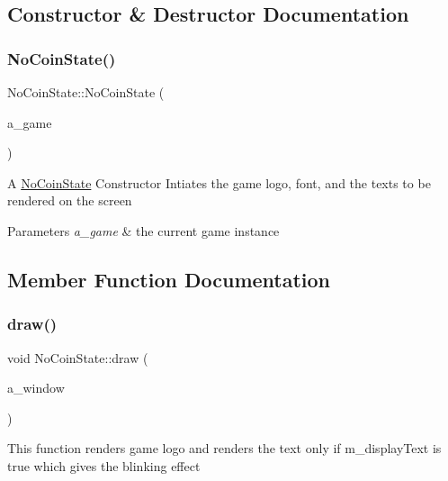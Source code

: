 \subsection{Constructor \& Destructor Documentation}
\mbox{\label{class_no_coin_state_a3c0129051f00eb142a2055e181264549}} 
\subsubsection{\texorpdfstring{No\+Coin\+State()}{NoCoinState()}}
{\footnotesize\ttfamily No\+Coin\+State\+::\+No\+Coin\+State (\begin{DoxyParamCaption}\item[{\hyperlink{class_game}{Game} $\ast$}]{a\+\_\+game }\end{DoxyParamCaption})}

A \hyperlink{class_no_coin_state}{No\+Coin\+State} Constructor Intiates the game logo, font, and the texts to be rendered on the screen 
\begin{DoxyParams}{Parameters}
{\em a\+\_\+game} & the current game instance \\
\hline
\end{DoxyParams}


\subsection{Member Function Documentation}
\mbox{\label{class_no_coin_state_ab1e920e22b90f9d36954e75ea49c3f9b}} 
\subsubsection{\texorpdfstring{draw()}{draw()}}
{\footnotesize\ttfamily void No\+Coin\+State\+::draw (\begin{DoxyParamCaption}\item[{sf\+::\+Render\+Window \&}]{a\+\_\+window }\end{DoxyParamCaption})\hspace{0.3cm}{\ttfamily [virtual]}}

This function renders game logo and renders the text only if m\+\_\+display\+Text is true which gives the blinking effect


